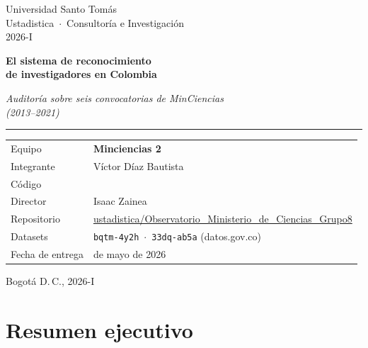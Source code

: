 \documentclass[11pt,a4paper,oneside]{article}
\title{}
\author{}
\date{}
\newcommand{\equipoInforme}{Minciencias 2}
\newcommand{\autorInforme}{Víctor Díaz Bautista}
\newcommand{\codigoInforme}{2274325}
\newcommand{\directorInforme}{Isaac Zainea}
\newcommand{\universidad}{Universidad Santo Tomás}
\newcommand{\unidad}{Ustadistica \,$\cdot$\, Consultoría e Investigación}
\newcommand{\periodo}{2026-I}
\newcommand{\fechaEntrega}{26 de mayo de 2026}
\newcommand{\repoUrl}{https://github.com/ustadistica/Observatorio\_Ministerio\_de\_Ciencias\_Grupo8}
\begin{document}

\begin{titlepage}
\thispagestyle{empty}
\centering
\vspace*{1.4cm}
{\footnotesize\sffamily\color{rule}\universidad\\\unidad\\\periodo}\par
\vspace{2.2cm}
{\Huge\bfseries\color{usta} El sistema de reconocimiento\\[2pt] de investigadores en Colombia}\par
\vspace{0.8cm}
{\Large\itshape Auditoría sobre seis convocatorias de MinCiencias\\(2013--2021)}\par
\vspace{2.4cm}

{\color{accent}\rule{0.4\linewidth}{0.6pt}}

\vspace{0.8cm}
\begin{tabularx}{0.78\linewidth}{>{\raggedright\arraybackslash}X >{\raggedleft\arraybackslash}X}
\sffamily\color{rule}\footnotesize Equipo & \textbf{\equipoInforme} \\[3pt]
\sffamily\color{rule}\footnotesize Integrante & \autorInforme \\[3pt]
\sffamily\color{rule}\footnotesize Código & \codigoInforme \\[3pt]
\sffamily\color{rule}\footnotesize Director & \directorInforme \\[3pt]
\sffamily\color{rule}\footnotesize Repositorio & \href{\repoUrl}{ustadistica/Observatorio\_Ministerio\_de\_Ciencias\_Grupo8} \\[3pt]
\sffamily\color{rule}\footnotesize Datasets & \texttt{bqtm-4y2h} \,$\cdot$\, \texttt{33dq-ab5a} (datos.gov.co) \\[3pt]
\sffamily\color{rule}\footnotesize Fecha de entrega & \fechaEntrega
\end{tabularx}

\vfill
{\footnotesize\color{rule}Bogotá D.\,C., \periodo}
\end{titlepage}

\section*{Resumen ejecutivo}
\end{document}
